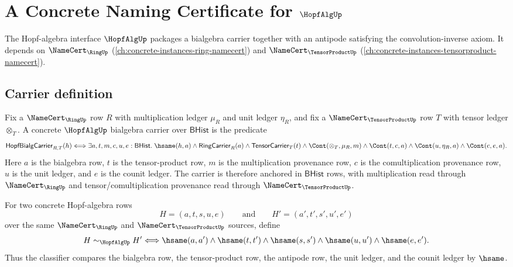 \chapter{A Concrete Naming Certificate for $\HopfAlgUp$}
\label{ch:concrete-instances-hopfalg-namecert}

The Hopf-algebra interface $\HopfAlgUp$ packages a bialgebra carrier together with an antipode satisfying the convolution-inverse axiom. It depends on $\NameCert_{\RingUp}$ (\autoref{ch:concrete-instances-ring-namecert}) and $\NameCert_{\TensorProductUp}$ (\autoref{ch:concrete-instances-tensorproduct-namecert}).

\section{Carrier definition}
\label{sec:hopfalg-carrier}

\begin{definition}\label{def:hopfalg-bhist-bialgebra-carrier}
Fix a $\NameCert_{\RingUp}$ row $R$ with multiplication ledger $\mu_R$ and unit ledger $\eta_R$, and fix a $\NameCert_{\TensorProductUp}$ row $T$ with tensor ledger $\otimes_T$. A concrete $\HopfAlgUp$ bialgebra carrier over $\mathsf{BHist}$ is the predicate
$$
\mathsf{HopfBialgCarrier}_{R,T}(h)
\Longleftrightarrow
\exists a,t,m,c,u,e:\mathsf{BHist}.\;
\hsame(h,a)\land
\mathsf{RingCarrier}_R(a)\land
\mathsf{TensorCarrier}_T(t)\land
\Cont(\otimes_T,\mu_R,m)\land
\Cont(t,c,a)\land
\Cont(u,\eta_R,a)\land
\Cont(c,e,a).
$$
Here $a$ is the bialgebra row, $t$ is the tensor-product row, $m$ is the multiplication provenance row, $c$ is the comultiplication provenance row, $u$ is the unit ledger, and $e$ is the counit ledger. The carrier is therefore anchored in $\mathsf{BHist}$ rows, with multiplication read through $\NameCert_{\RingUp}$ and tensor/comultiplication provenance read through $\NameCert_{\TensorProductUp}$.
\end{definition}

\begin{definition}\label{def:hopfalg-antipode-ledger-classifier}
For two concrete Hopf-algebra rows
$$
H=(a,t,s,u,e)
\qquad\text{and}\qquad
H'=(a',t',s',u',e')
$$
over the same $\NameCert_{\RingUp}$ and $\NameCert_{\TensorProductUp}$ sources, define
$$
H\sim_{\HopfAlgUp}H'
\Longleftrightarrow
\hsame(a,a')\land
\hsame(t,t')\land
\hsame(s,s')\land
\hsame(u,u')\land
\hsame(e,e').
$$
Thus the classifier compares the bialgebra row, the tensor-product row, the antipode row, the unit ledger, and the counit ledger by $\hsame$.
\end{definition}

